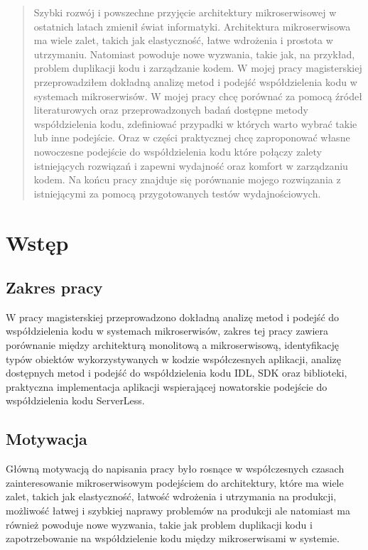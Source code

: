 \documentclass[runningheads,12pt]{llncs}
\begin{document}
\newpage

\begin{abstract}
Szybki rozwój i powszechne przyjęcie architektury mikroserwisowej w ostatnich latach zmienił świat informatyki. Architektura mikroserwisowa ma wiele zalet, takich jak elastyczność, łatwe wdrożenia i prostota w utrzymaniu. Natomiast powoduje nowe wyzwania, takie jak, na przykład, problem duplikacji kodu i zarządzanie kodem. W mojej pracy magisterskiej przeprowadziłem dokładną analizę metod i podejść współdzielenia kodu w systemach mikroserwisów. W mojej pracy chcę porównać za pomocą źródeł literaturowych oraz przeprowadzonych badań dostępne metody współdzielenia kodu, zdefiniować przypadki w których warto wybrać takie lub inne podejście. Oraz w części praktycznej chcę zaproponować własne nowoczesne podejście do współdzielenia kodu które połączy zalety istniejących rozwiązań i zapewni wydajność oraz komfort w zarządzaniu kodem. Na końcu pracy znajduje się porównanie mojego rozwiązania z istniejącymi za pomocą przygotowanych testów wydajnościowych.
\end{abstract}

\newpage

\tableofcontents

\newpage

\section{Wstęp}

\subsection{Zakres pracy}
W pracy magisterskiej przeprowadzono dokładną analizę metod i podejść do współdzielenia kodu w systemach mikroserwisów, zakres tej pracy zawiera porównanie między architekturą monolitową a mikroserwisową, identyfikację typów obiektów wykorzystywanych w kodzie współczesnych aplikacji, analizę dostępnych metod i podejść do współdzielenia kodu IDL, SDK oraz biblioteki, praktyczna implementacja aplikacji wspierającej nowatorskie podejście do współdzielenia kodu ServerLess.

\subsection{Motywacja}
Główną motywacją do napisania pracy było rosnące w współczesnych czasach zainteresowanie mikroserwisowym podejściem do architektury, które ma wiele zalet, takich jak elastyczność, łatwość wdrożenia i utrzymania na produkcji, możliwość łatwej i szybkiej naprawy problemów na produkcji ale natomiast ma również powoduje nowe wyzwania, takie jak problem duplikacji kodu i zapotrzebowanie na współdzielenie kodu między mikroserwisami w systemie.
\end{document}
